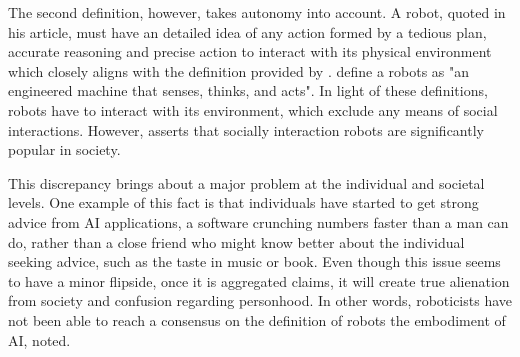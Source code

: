 \documentclass[man]{apa6}
\begin{document}
The second definition, however, takes autonomy into account.
A robot,  quoted in his article, must have an detailed idea of any action formed by a tedious plan, accurate reasoning and precise action to interact with its physical environment which closely aligns with the definition provided by \cite{lin}. 
\citeauthor{lin} \citeyear[p.~943]{lin} define a robots as "an engineered machine that senses, thinks, and acts".
In light of these definitions, robots have to interact with its environment, which exclude any means of social interactions.
However,  asserts that socially interaction robots are significantly popular in society.


This discrepancy brings about a major problem at the individual and societal levels.
One example of this fact is that individuals have started to get strong advice from AI applications, a software crunching numbers faster than a man can do, rather than a close friend who might know better about the individual seeking advice, such as the taste in music or book.
Even though this issue seems to have a minor flipside, once it is aggregated  claims, it will create true alienation from society and confusion regarding personhood.
In other words, roboticists have not been able  to reach a consensus on the definition of robots the embodiment of AI,  noted.
\par
\end{document}
